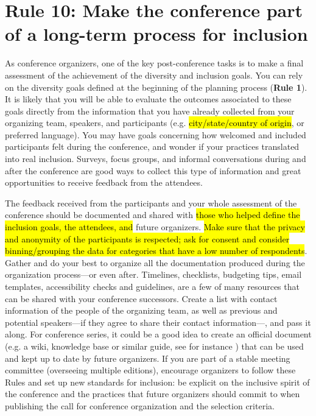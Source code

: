 \documentclass[10pt,letterpaper]{article}
\begin{document}
\section*{Rule 10: Make the conference part of a long-term process for inclusion}
\label{rule_process}

As conference organizers, one of the key post-conference tasks is to make a final assessment of the achievement of the diversity and inclusion goals. 
You can rely on the diversity goals defined at the beginning of the planning process (\textbf{Rule 1}). 
It is likely that you will be able to evaluate the outcomes associated to these goals directly from the information that you have already collected from your organizing team, speakers, and participants (e.g. \hl{city/state/country of origin}, or preferred language).
You may have goals concerning how welcomed and included participants felt during the conference, and wonder if your practices translated into real inclusion. 
Surveys, focus groups, and informal conversations during and after the conference are good ways to collect this type of information and great opportunities to receive feedback from the attendees. 

The feedback received from the participants and your whole assessment of the conference should be documented and shared with  \hl{those who helped define the inclusion goals, the attendees, and} future organizers. 
\hl{Make sure that the privacy and anonymity of the participants is respected; ask for consent and consider binning/grouping the data for categories that have a low number of respondents}.
Gather and do your best to organize all the documentation produced during the organization process---or even after. Timelines, checklists, budgeting tips, email templates, accessibility checks and guidelines, are a few of many resources that can be shared with your conference successors. 
Create a list with contact information of the people of the organizing team, as well as previous and potential speakers---if they agree to share their contact information---, and pass it along.
For conference series, it could be a good idea to create an official document (e.g. a wiki, knowledge base or similar guide, see for instance \cite{sanchez-tapia_user_2021-2}) that can be used and kept up to date by future organizers.
If you are part of a stable meeting committee (overseeing multiple editions), encourage organizers to follow these Rules and set up new standards for inclusion: be explicit on the inclusive spirit of the conference and the practices that future organizers should commit to when publishing the call for conference organization and the selection criteria. 
\end{document}
